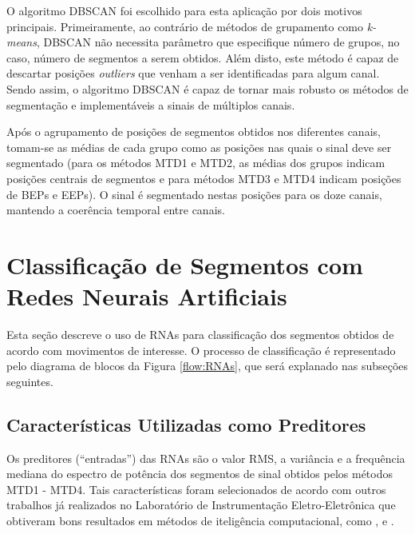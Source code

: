 O algoritmo DBSCAN foi escolhido para esta aplicação por dois motivos principais. Primeiramente, ao contrário de métodos de grupamento como \emph{k-means}, DBSCAN não necessita parâmetro que especifique número de grupos, no caso, número de segmentos a serem obtidos. Além disto, este método é capaz de descartar posições \emph{outliers} que venham a ser identificadas para algum canal. Sendo assim, o algoritmo DBSCAN é capaz de tornar mais robusto os métodos de segmentação e implementáveis a sinais de múltiplos canais.

Após o agrupamento de posições de segmentos obtidos nos diferentes canais, tomam-se as médias de cada grupo como as posições nas quais o sinal deve ser segmentado (para os métodos MTD1 e MTD2, as médias dos grupos indicam posições centrais de segmentos e para métodos MTD3 e MTD4 indicam posições de BEPs e EEPs). O sinal é segmentado nestas posições para os doze canais, mantendo a coerência temporal entre canais.

		\section{Classificação de Segmentos com Redes Neurais Artificiais}
Esta seção descreve o uso de RNAs para classificação dos segmentos obtidos de acordo com movimentos de interesse. O processo de classificação é representado pelo diagrama de blocos da Figura \ref{flow:RNAs}, que será explanado nas subseções seguintes.



			\subsection{Características Utilizadas como Preditores}
Os preditores (``entradas'') das RNAs são o valor RMS, a variância e a frequência mediana do espectro de potência dos segmentos de sinal obtidos pelos métodos MTD1 - MTD4. Tais características foram selecionados de acordo com outros trabalhos já realizados no Laboratório de Instrumentação Eletro-Eletrônica que obtiveram bons resultados em métodos de iteligência computacional, como \cite{Favieiro2009}, \cite{Schons2014} e \cite{Cene2015}.

